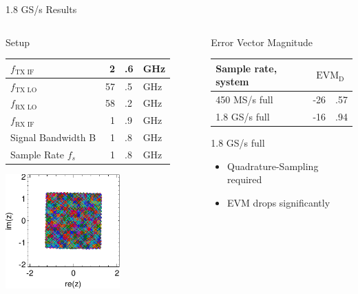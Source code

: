 \documentclass[10pt]{beamer}
\newcommand{\mc}[2]{\multicolumn{#1}{c|}{#2}}
\begin{document}
\begin{frame}{1.8 GS/s Results}
  \begin{columns}[T]
    \begin{column}{.5\textwidth}
      \begin{block}{Setup}
        \begin{tabular}{|l|r@{}l@{~}l|}
          \hline
          $f_{\text{TX IF}}$ & 2&.6&GHz \\ \hline
          $f_{\text{TX LO}}$ & 57&.5&GHz \\ \hline
          $f_{\text{RX LO}}$ & 58&.2&GHz \\ \hline
          $f_{\text{RX IF}}$ & 1&.9&GHz \\ \hline
          Signal Bandwidth B & 1&.8&GHz \\ \hline
          Sample Rate $f_s$ & 1&.8&GHz \\ \hline
        \end{tabular}
      \end{block}
      \includegraphics[width=0.6\textwidth]{figures/matlab/res_450_qam256_cp_corr_pcorr_initial}
    \end{column}
    \begin{column}{.5\textwidth}
      \begin{block}{Error Vector Magnitude}
        \begin{tabular}{|l|r@{}l|}
          \hline
          Sample rate, system             & \mc{2}{$\text{EVM}_\text{D}$} \\ \hline
          450 MS/s full                   & -26&.57      \\ \hline
          1.8 GS/s full                   & -16&.94      \\ \hline
        \end{tabular}
      \end{block}
      \begin{block}{1.8 GS/s full}
        \begin{itemize}
        \item Quadrature-Sampling required
        \item EVM drops significantly
        \end{itemize}
      \end{block}
    \end{column}
  \end{columns}
\end{frame}
\end{document}
